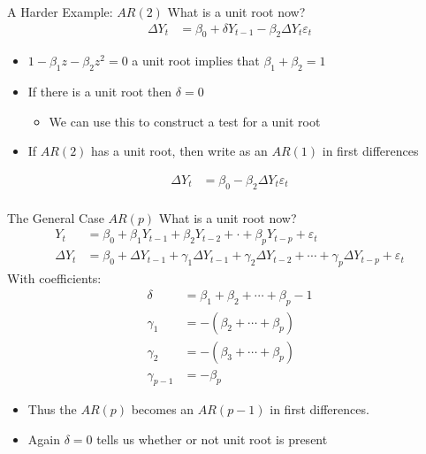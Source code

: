\begin{frame}{A Harder Example: $AR(2)$}
What is a unit root now?
\begin{align*}
\Delta Y_t &= \beta_0 + \delta Y_{t-1} - \beta_2 \Delta Y_t  \varepsilon_t
\end{align*}
\begin{itemize}
\item $1- \beta_1 z - \beta_2 z^2 = 0$ a unit root implies that $\beta_1 + \beta_2=1$
\item If there is a unit root then $\delta=0$
\begin{itemize}
\item We can use this to construct a test for a unit root
\end{itemize}
\item If $AR(2)$ has a unit root, then write as an $AR(1)$ in first differences
\end{itemize}
\begin{align*}
\Delta Y_t &= \beta_0 - \beta_2 \Delta Y_t  \varepsilon_t\\
\end{align*}
\end{frame}

\begin{frame}{The General Case $AR(p)$}
What is a unit root now?
\begin{align*}
Y_t &= \beta_0 + \beta_1 Y_{t-1} + \beta_2 Y_{t-2} + \cdot + \beta_p Y_{t-p} + \varepsilon_t\\
\Delta Y_t &= \beta_0 + \Delta Y_{t-1} + \gamma_1 \Delta Y_{t-1} + \gamma_2 \Delta Y_{t-2} +  \cdots +  \gamma_p \Delta Y_{t-p}  + \varepsilon_t
\end{align*}
With coefficients:
\begin{align*}
\delta &= \beta_1 + \beta_2 + \cdots + \beta_p -1\\
\gamma_1 &=  -(\beta_2 + \cdots + \beta_p)\\
\gamma_2 &=  -(\beta_3 + \cdots + \beta_p)\\
\gamma_{p-1} &=  -\beta_p
\end{align*}
\begin{itemize}
    \item Thus the $AR(p)$ becomes an $AR(p-1)$ in first differences.
    \item Again $\delta=0$ tells us whether or not unit root is present
\end{itemize}
\end{frame}

